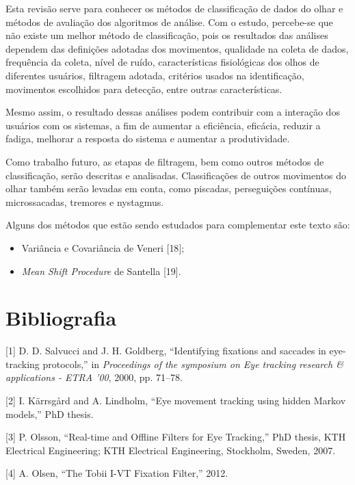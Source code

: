 \documentclass[brazil,]{report}
\begin{document}
Esta revisão serve para conhecer os métodos de classificação de dados do
olhar e métodos de avaliação dos algoritmos de análise. Com o estudo,
percebe-se que não existe um melhor método de classificação, pois os
resultados das análises dependem das definições adotadas dos movimentos,
qualidade na coleta de dados, frequência da coleta, nível de ruído,
características fisiológicas dos olhos de diferentes usuários, filtragem
adotada, critérios usados na identificação, movimentos escolhidos para
detecção, entre outras características.

Mesmo assim, o resultado dessas análises podem contribuir com a
interação dos usuários com os sistemas, a fim de aumentar a eficiência,
eficácia, reduzir a fadiga, melhorar a resposta do sistema e aumentar a
produtividade.

Como trabalho futuro, as etapas de filtragem, bem como outros métodos de
classificação, serão descritas e analisadas. Classificações de outros
movimentos do olhar também serão levadas em conta, como piscadas,
perseguições contínuas, microssacadas, tremores e nystagmus.

Alguns dos métodos que estão sendo estudados para complementar este
texto são:

\begin{itemize}
\itemsep1pt\parskip0pt
\item
  Variância e Covariância de Veneri {[}18{]};
\item
  \emph{Mean Shift Procedure} de Santella {[}19{]}.
\end{itemize}

\chapter{Bibliografia}\label{bibliografia}

{[}1{]} D. D. Salvucci and J. H. Goldberg, ``Identifying fixations and
saccades in eye-tracking protocols,'' in \emph{Proceedings of the
symposium on Eye tracking research \& applications - ETRA '00}, 2000,
pp. 71--78.

{[}2{]} I. Kärrsgård and A. Lindholm, ``Eye movement tracking using
hidden Markov models,'' PhD thesis.

{[}3{]} P. Olsson, ``Real-time and Offline Filters for Eye Tracking,''
PhD thesis, KTH Electrical Engineering; KTH Electrical Engineering,
Stockholm, Sweden, 2007.

{[}4{]} A. Olsen, ``The Tobii I-VT Fixation Filter,'' 2012.
\end{document}
